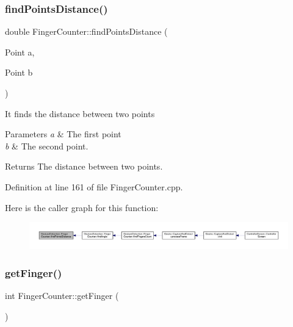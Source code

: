 \subsubsection{\texorpdfstring{find\+Points\+Distance()}{findPointsDistance()}}
{\footnotesize\ttfamily double Finger\+Counter\+::find\+Points\+Distance (\begin{DoxyParamCaption}\item[{Point}]{a,  }\item[{Point}]{b }\end{DoxyParamCaption})\hspace{0.3cm}{\ttfamily [private]}}

It finds the distance between two points


\begin{DoxyParams}{Parameters}
{\em a} & The first point \\
\hline
{\em b} & The second point.\\
\hline
\end{DoxyParams}
\begin{DoxyReturn}{Returns}
The distance between two points. 
\end{DoxyReturn}


Definition at line 161 of file Finger\+Counter.\+cpp.

Here is the caller graph for this function\+:
\nopagebreak
\begin{figure}[H]
\begin{center}
\leavevmode
\includegraphics[width=350pt]{class_gesture_detection_1_1_finger_counter_a51fdf57f5f19911f34778e925d50b480_icgraph}
\end{center}
\end{figure}
\mbox{\label{class_gesture_detection_1_1_finger_counter_ab8a8c1f8ddc9eda04ac2bb16820c4c14}} 
\subsubsection{\texorpdfstring{get\+Finger()}{getFinger()}}
{\footnotesize\ttfamily int Finger\+Counter\+::get\+Finger (\begin{DoxyParamCaption}{ }\end{DoxyParamCaption})\hspace{0.3cm}{\ttfamily [private]}}

